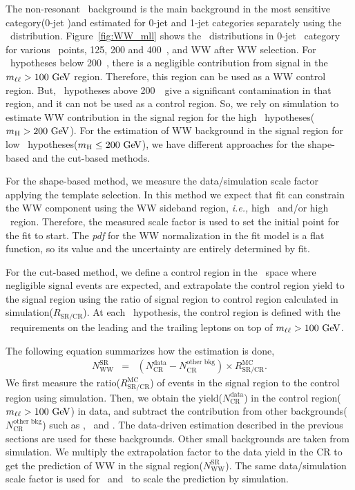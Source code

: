 The non-resonant \WW\ background is the main background in the most sensitive 
category(0-jet \DF)and estimated for 0-jet and 1-jet categories separately 
using the \mll\ distribution.
Figure~\ref{fig:WW_mll} shows the \mll\ distributions in 0-jet \DF\ 
category for various \mHi\ points, 125, 200 and 400~\GeV, and WW after WW selection. 
For \mHi\ hypotheses below 200~\GeV, 
there is a negligible contribution from signal in the $m_{\ell\ell}>100~\mathrm{Ge\kern -0.1em V}$ region. 
Therefore, this region can be used as a WW control region.  
But, \mHi\ hypotheses above 200~\GeV\ give a significant contamination in that region,
and it can not be used as a control region. So, we rely on simulation
to estimate WW contribution in the signal region for the high \mHi\ hypotheses($m_{\mathrm{H}}>200~\mathrm{Ge\kern -0.1em V}$). 
For the estimation of WW background in the signal region 
for low \mHi\ hypotheses($m_{\mathrm{H}}\le200~\mathrm{Ge\kern -0.1em V}$), 
we have different approaches for the shape-based and the cut-based methods. 

For the shape-based method, we measure the data/simulation scale factor 
applying the template selection. 
In this method we expect that fit can constrain the WW component using 
the WW sideband region, \textit{i.e.,} high \mT\ and/or high \mll\ region. Therefore,   
the measured scale factor is used to set the initial point for the fit to start. 
The \textit{pdf} for the WW normalization in the fit model is a flat function, 
so its value and the uncertainty are entirely determined by fit. 

For the cut-based method, we define a control region in the \mll\ space where 
negligible signal events are expected, and extrapolate the control region yield 
to the signal region using the ratio of signal region to control region calculated 
in simulation($R_{\textrm{SR/CR}}$). 
At each \mHi\ hypothesis, the control region is defined with the \pt\ requirements 
on the leading and the trailing leptons on top of $m_{\ell\ell}>100~\mathrm{Ge\kern -0.1em V}$. 

The following equation summarizes how the estimation is done, 
\begin{eqnarray} 
N_{\textrm{WW}}^{\textrm{SR}} 
&=&  
\left( N_{\textrm{CR}}^{\textrm{data}}  
     - N_{\textrm{CR}}^{\textrm{other bkg}}\right) \times R_\textrm{SR/CR}^{\textrm{MC}}.  
\end{eqnarray} 
We first measure the ratio($R_\textrm{SR/CR}^{\textrm{MC}}$) of events in the signal region 
to the control region using simulation.  
Then, we obtain the yield($N_{\textrm{CR}}^{\textrm{data}}$) in the 
control region($m_{\ell\ell}>100~\mathrm{Ge\kern -0.1em V}$) in data, and subtract the contribution from other 
backgrounds($N_{\textrm{CR}}^{\textrm{other bkg}}$) such as \topbkg, \Wjets\ and \dyll.  
The data-driven estimation described in the previous sections are used for 
these backgrounds. Other small backgrounds are taken from simulation. 
We multiply the extrapolation factor to the data yield in the CR 
to get the prediction of WW in the signal region($N_{\textrm{WW}}^{\textrm{SR}}$).
The same data/simulation scale factor is used for \qqww\ and \ggww\ to scale 
the prediction by simulation. 

